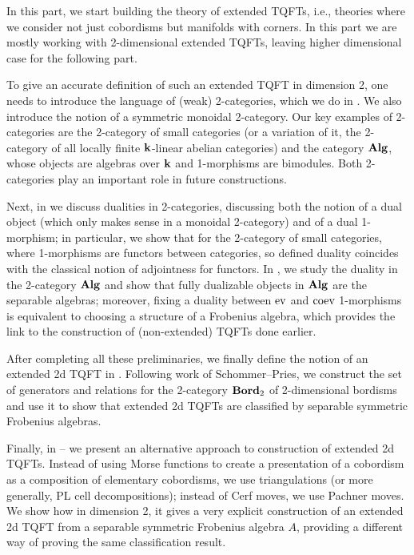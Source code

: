 In this part, we start building the theory of extended TQFTs, i.e., theories
where we consider not just cobordisms but manifolds with corners. In this part
we are mostly working with 2-dimensional extended TQFTs, leaving higher
dimensional case for the following part.

To give an accurate definition of such an extended TQFT in dimension 2, one
needs to introduce the language of (weak) 2-categories, which we do in
. We also introduce the notion of a symmetric monoidal
2-category. Our key examples of 2-categories are the 2-category of small
categories (or a variation of it, the 2-category of all locally finite
$\mathbf{k}$-linear abelian categories) and the category $\mathbf{Alg}$, whose objects are
algebras over $\mathbf{k}$ and 1-morphisms are bimodules. Both 2-categories play an
important role in future constructions.

Next, in  we discuss dualities in 2-categories, discussing
both the notion of a dual object (which only makes sense in a monoidal
2-category) and of a dual 1-morphism; in particular, we show that for the
2-category of small categories, where 1-morphisms are functors between
categories, so defined duality coincides with the classical notion of
adjointness for functors.
In , we study the duality in the 2-category $\mathbf{Alg}$
and show that fully dualizable objects in $\mathbf{Alg}$ are the separable algebras;
moreover, fixing a duality between $\operatorname{ev}$ and $\operatorname{coev}$ 1-morphisms is equivalent
to choosing a structure of a Frobenius algebra, which provides the link to the
construction of (non-extended) TQFTs done earlier.


After completing all these preliminaries, we finally define the notion of an
extended 2d TQFT in . Following work of Schommer--Pries, we
construct the set of generators and relations for the 2-category $\mathbf{Bord}_2$ of
2-dimensional bordisms and use it to show that extended 2d TQFTs are classified
by separable symmetric Frobenius algebras.

Finally, in -- we present an alternative
approach to construction of extended 2d TQFTs. Instead of using Morse functions
to create a presentation of a cobordism as a composition of elementary
cobordisms, we use triangulations (or more generally, PL cell decompositions);
instead of Cerf moves, we use Pachner moves. We show how in dimension 2, it
gives a very explicit construction of an extended 2d TQFT from a separable
symmetric Frobenius algebra $A$, providing a different way of proving the same
classification result.